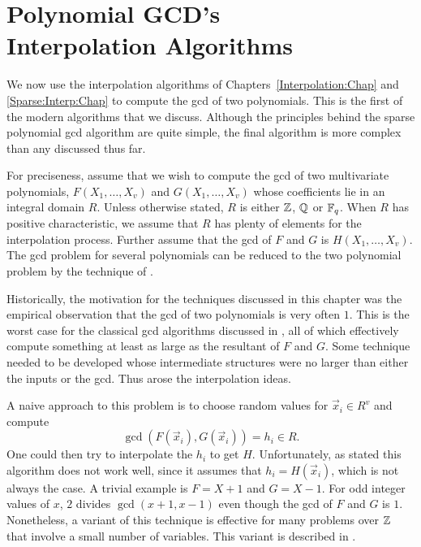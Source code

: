 \chapter[Polynomial GCD's: Interpolation Algorithms]{Polynomial GCD's\\Interpolation Algorithms}
\label{Poly:GCD:Chap}


We now use the interpolation algorithms of
Chapters~\ref{Interpolation:Chap} and \ref{Sparse:Interp:Chap} to
compute the {\sc gcd} of two polynomials.  This is the first of the
modern algorithms that we discuss.  Although the principles
behind the sparse polynomial {\sc gcd} algorithm are quite simple, the
final algorithm is more complex than any discussed thus far.

For preciseness, assume that we wish to compute the {\sc gcd} of two
multivariate polynomials, $F(X_1, \ldots, X_v)$ and $G(X_1, \ldots,
X_v)$ whose coefficients lie in an integral domain $R$.  Unless
otherwise stated, $R$ is either $\mathbb{Z}$, $\mathbb{Q}$ or $\mathbb{F}_q$.  When $R$ has
positive characteristic, we assume that $R$ has plenty of elements for
the interpolation process. Further assume that the {\sc gcd} of $F$ and
$G$ is $H(X_1, \ldots, X_v)$.  The {\sc gcd} problem for several
polynomials can be reduced to the two polynomial problem by the
technique of .

Historically, the motivation for the techniques discussed in this
chapter was the empirical observation that the {\sc gcd} of two
polynomials is very often $1$.  This is the worst case for
the classical {\sc gcd} algorithms discussed in ,
all of which effectively compute something at least as large as the
resultant of $F$ and $G$.  Some technique needed to be
developed whose intermediate structures were no larger than either the inputs
or the {\sc gcd}.  Thus arose the interpolation ideas.

A naive approach to this problem is to choose random values for
$\vec{x}_i \in R^v$ and compute 
\[
\gcd(F(\vec{x}_i), G(\vec{x}_i)) = h_i \in R.
\]
One could then try to interpolate the $h_i$ to get $H$.
Unfortunately, as stated this algorithm does not work well, since it
assumes that $h_i = H(\vec{x}_i)$, which is not always the case.  A
trivial example is $F = X+1$ and $G = X-1$.  For odd integer values of
$x$, $2$ divides $\gcd(x+1, x-1)$ even though the {\sc gcd} of $F$ and $G$
is $1$.  Nonetheless, a variant of this technique is effective for
many problems over $\mathbb{Z}$ that involve a small number of variables.
This variant is described in .

